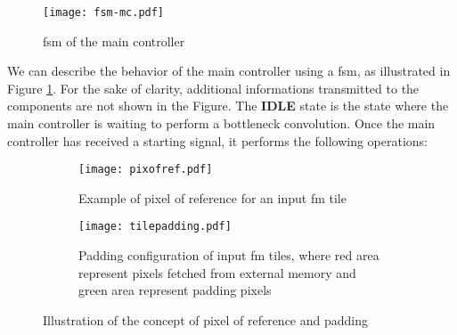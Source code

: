 %
\begin{figure}
    \centering
    \texttt{[image: fsm-mc.pdf]}
    \caption{\acrshort{fsm} of the main controller}
    \label{fig:fsm_mc}
\end{figure}
We can describe the behavior of the main controller using a \acrfull{fsm}, as illustrated in Figure \ref{fig:fsm_mc}. For the sake of clarity, additional informations transmitted to the components are not shown in the Figure. The \textbf{IDLE} state is the state where the main controller is waiting to perform a bottleneck convolution. Once the main controller has received a starting signal, it performs the following operations:
%
\begin{figure}
    \centering
    \begin{subfigure}[t]{.49\textwidth}
        \centering
        \texttt{[image: pixofref.pdf]}
        \caption{Example of pixel of reference for an input \acrshort{fm} tile}
        \label{fig:pix_of_ref}
    \end{subfigure}
    \begin{subfigure}[t]{.49\textwidth}
        \centering
        \texttt{[image: tilepadding.pdf]}
        \caption{Padding configuration of input \acrshort{fm} tiles, where red area represent pixels fetched from external memory and green area represent padding pixels}
        \label{fig:tile_padding}
    \end{subfigure}
    \caption{Illustration of the concept of pixel of reference and padding}
\end{figure}
%
